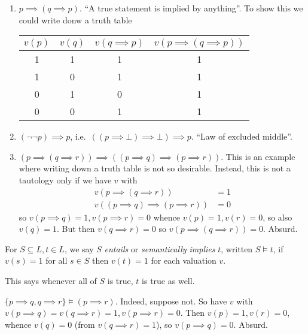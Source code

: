 \documentclass[a4paper]{article}
\begin{document}
\begin{eg}\leavevmode
  \begin{enumerate}
  \item \(p \implies (q \implies p)\). ``A true statement is implied by anything''. To show this we could write donw a truth table
    \begin{table}[h]
      \centering
      \begin{tabular}{c|c|c|c}
        \(v(p)\) & \(v(q)\) & \(v(q \implies p)\) & \(v(p \implies (q \implies p))\) \\\hline
        1 & 1 & 1 & 1 \\
        1 & 0 & 1 & 1 \\
        0 & 1 & 0 & 1 \\
        0 & 0 & 1 & 1
      \end{tabular}
    \end{table}
  \item \((\neg \neg p) \implies p\), i.e.\ \(((p \implies \bot) \implies \bot) \implies p\). ``Law of excluded middle''.
  \item \((p \implies (q \implies r)) \implies ((p \implies q) \implies (p \implies r))\). This is an example where writing down a truth table is not so desirable. Instead, this is not a tautology only if we have \(v\) with
    \begin{align*}
      v(p \implies (q\implies r)) &= 1 \\
      v((p \implies q) \implies (p \implies r)) &= 0
    \end{align*}
    so \(v(p \implies q) = 1, v(p \implies r) = 0\) whence \(v(p) = 1, v(r) = 0\), so also \(v(q) = 1\). But then \(v(q \implies r) = 0\) so \(v(p \implies (q \implies r)) = 0\). Absurd.
  \end{enumerate}
\end{eg}

\begin{definition}
  For \(S \subseteq L, t \in L\), we say \(S\) \emph{entails} or \emph{semantically implies} \(t\), written \(S \models t\), if \(v(s) = 1\) for all \(s \in S\) then \(v(t) = 1\) for each valuation \(v\).
\end{definition}

This says whenever all of \(S\) is true, \(t\) is true as well.

\begin{eg}
  \(\{p \implies q, q \implies r\} \models (p \implies r)\). Indeed, suppose not. So have \(v\) with \(v(p \implies q) = v(q \implies r) = 1, v(p \implies r) = 0\). Then \(v(p) = 1, v(r) = 0\), whence \(v(q) = 0\) (from \(v(q \implies r) = 1\)), so \(v(p \implies q) = 0\). Absurd.
\end{eg}
\end{document}

